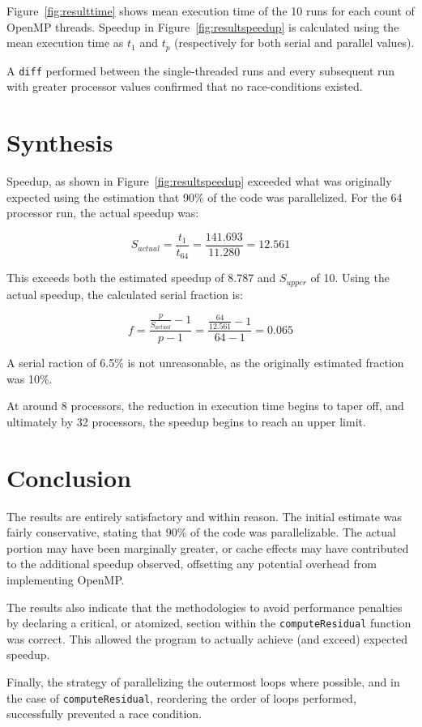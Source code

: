 \documentclass{article}
\begin{document}
  Figure~\ref{fig:resulttime} shows mean execution time of the 10 runs for each
  count of OpenMP threads. Speedup in Figure~\ref{fig:resultspeedup} is
  calculated using the mean execution time as \(t_1\) and \(t_p\) (respectively
  for both serial and parallel values).

  A \verb|diff| performed between the single-threaded runs and every subsequent
  run with greater processor values confirmed that no race-conditions existed.

  \section{Synthesis}

  Speedup, as shown in Figure~\ref{fig:resultspeedup} exceeded what was
  originally expected using the estimation that 90\% of the code was
  parallelized. For the 64 processor run, the actual speedup was:

  \[ S_{actual} = \frac{t_1}{t_64} = \frac{141.693}{11.280} = 12.561 \]

  This exceeds both the estimated speedup of 8.787 and \(S_{upper}\) of 10.
  Using the actual speedup, the calculated serial fraction is:

  \[ f = \frac{\frac{p}{S_{actual}} - 1}{p - 1} = \frac{\frac{64}{12.561} - 1}{64 - 1} = 0.065 \]

  A serial raction of 6.5\% is not unreasonable, as the originally estimated
  fraction was 10\%.

  At around 8 processors, the reduction in execution time begins to taper off,
  and ultimately by 32 processors, the speedup begins to reach an upper limit.

  \section{Conclusion}

  The results are entirely satisfactory and within reason. The initial estimate
  was fairly conservative, stating that 90\% of the code was parallelizable.
  The actual portion may have been marginally greater, or cache effects may
  have contributed to the additional speedup observed, offsetting any potential
  overhead from implementing OpenMP.

  The results also indicate that the methodologies to avoid performance
  penalties by declaring a critical, or atomized, section within the 
  \verb|computeResidual| function was correct. This allowed the program to
  actually achieve (and exceed) expected speedup.

  Finally, the strategy of parallelizing the outermost loops where possible,
  and in the case of \verb|computeResidual|, reordering the order of loops
  performed, successfully prevented a race condition.
\end{document}
